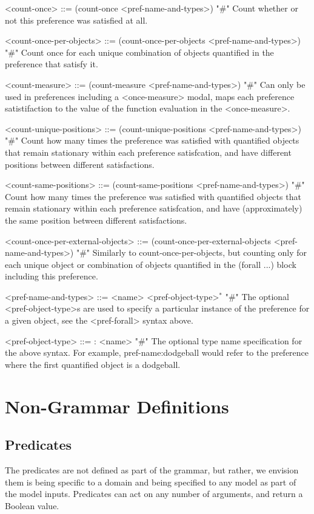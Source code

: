 \documentclass{article}
\begin{document}
\begin{grammar}
<count-once> ::= (count-once <pref-name-and-types>) "#" Count whether or not this preference was satisfied at all.

<count-once-per-objects> ::= (count-once-per-objects <pref-name-and-types>) "#" Count once for each unique combination of objects quantified in the preference that satisfy it.

<count-measure> ::= (count-measure <pref-name-and-types>) "#" Can only be used in preferences including a <once-measure> modal, maps each preference satistifaction to the value of the function evaluation in the <once-measure>.

<count-unique-positions> ::= (count-unique-positions <pref-name-and-types>) "#" Count how many times the preference was satisfied with quantified objects that remain stationary within each preference satisfcation, and have different positions between different satisfactions.

<count-same-positions> ::= (count-same-positions <pref-name-and-types>) "#" Count how many times the preference was satisfied with quantified objects that remain stationary within each preference satisfcation, and have (approximately) the same position between different satisfactions.

<count-once-per-external-objects> ::=  (count-once-per-external-objects <pref-name-and-types>) "#" Similarly to count-once-per-objects, but counting only for each unique object or combination of objects quantified in the (forall ...) block including this preference.

<pref-name-and-types> ::= <name> <pref-object-type>$^*$ "#" The optional <pref-object-type>s are used to specify a particular instance of the preference for a given object, see the <pref-forall> syntax above.

    <pref-object-type> ::= : <name>  "#" The optional type name specification for the above syntax. For example, pref-name:dodgeball would refer to the preference where the first quantified object is a dodgeball.
    



\end{grammar}



\section{Non-Grammar Definitions}


\subsection{Predicates} \label{sec:predicates}
The predicates are not defined as part of the grammar, but rather, we envision them is being specific to a domain and being specified to any model as part of the model inputs. 
Predicates can act on any number of arguments, and return a Boolean value.
            
\end{document}
